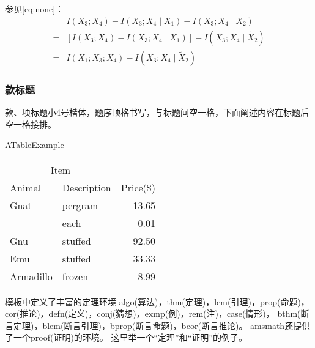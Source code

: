 \zhlipsum[1-3][name=simp]

参见\cref{eq:none}：
\begin{align}
\label{eq:none}
&I(X_3;X_4)-I(X_3;X_4\mid{}X_1)-I(X_3;X_4\mid{}X_2)\nonumber\\
=&[I(X_3;X_4)-I(X_3;X_4\mid{}X_1)]-I(X_3;X_4\mid{}\tilde{X}_2)\\
=&I(X_1;X_3;X_4)-I(X_3;X_4\mid{}\tilde{X}_2)
\end{align}
\zhlipsum[6-8][name=simp]


\zhlipsum[1-3][name=simp]

\begin{figure}[!htp]
	\centering
	\resizebox{10cm}{!}{}
	\label{fig:flow_chart}
\end{figure}

\zhlipsum[1-3][name=simp]

\subsubsection{款标题}
款、项标题小4号楷体，题序顶格书写，与标题间空一格，下面阐述内容在标题后空一格接排。

\begin{table}[!hpb]
	\centering
	{ATableExample}
	\label{tab:firstone}
	\begin{tabular}{@{}llr@{}}\toprule
		\multicolumn{2}{c}{Item}\\\cmidrule(r){1-2}
		Animal&Description&Price(\$)\\\midrule
		Gnat&pergram&13.65\\
		&each&0.01\\
		Gnu&stuffed&92.50\\
		Emu&stuffed&33.33\\
		Armadillo&frozen&8.99\\\bottomrule
	\end{tabular}
\end{table}

\zhlipsum[1-3][name=simp]

模板中定义了丰富的定理环境
algo(算法)，thm(定理)，lem(引理)，prop(命题)，cor(推论)，defn(定义)，conj(猜想)，exmp(例)，rem(注)，case(情形)，
bthm(断言定理)，blem(断言引理)，bprop(断言命题)，bcor(断言推论)。
amsmath还提供了一个proof(证明)的环境。
这里举一个“定理”和“证明”的例子。

